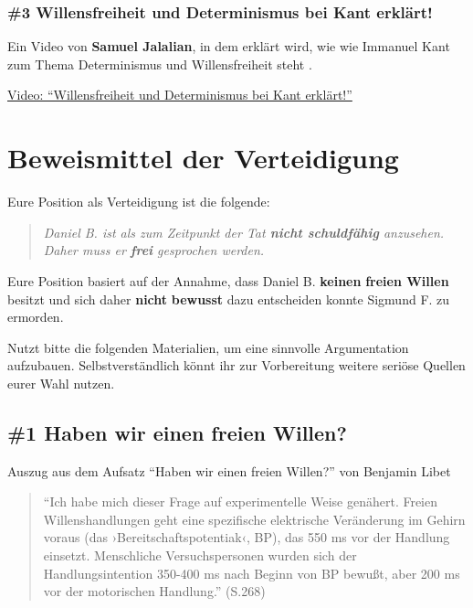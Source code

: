 \documentclass[
  a4paper,
]{report}
\begin{document}
\hypertarget{pr-expert-ev3}{%
\subsection{\#3 Willensfreiheit und Determinismus bei Kant erklärt!}\label{pr-expert-ev3}}

Ein Video von \textbf{Samuel Jalalian}, in dem erklärt wird, wie wie Immanuel Kant zum Thema Determinismus und Willensfreiheit steht \citep{Jalalian2022}.

\href{https://www.youtube.com/watch?v=Z8zJVcFVvX4}{Video: ``Willensfreiheit und Determinismus bei Kant erklärt!''}

\hypertarget{defence-evidence}{%
\chapter{Beweismittel der Verteidigung}\label{defence-evidence}}

Eure Position als Verteidigung ist die folgende:

\begin{quote}
\emph{Daniel B. ist als zum Zeitpunkt der Tat \textbf{nicht schuldfähig} anzusehen. Daher muss er \textbf{frei} gesprochen werden.}
\end{quote}

Eure Position basiert auf der Annahme, dass Daniel B. \textbf{keinen} \textbf{freien Willen} besitzt und sich daher \textbf{nicht} \textbf{bewusst} dazu entscheiden konnte Sigmund F. zu ermorden.

Nutzt bitte die folgenden Materialien, um eine sinnvolle Argumentation aufzubauen. Selbstverständlich könnt ihr zur Vorbereitung weitere seriöse Quellen eurer Wahl nutzen.

\hypertarget{def-ev1}{%
\section{\#1 Haben wir einen freien Willen?}\label{def-ev1}}

Auszug aus dem Aufsatz ``Haben wir einen freien Willen?'' von Benjamin Libet \citeyearpar{Libet2004}

\begin{quote}
``Ich habe mich dieser Frage auf experimentelle Weise genähert. Freien Willenshandlungen geht eine spezifische elektrische Veränderung im Gehirn voraus (das ›Bereitschaftspotentiak‹, BP), das 550 ms vor der Handlung einsetzt. Menschliche Versuchspersonen wurden sich der Handlungsintention 350-400 ms nach Beginn von BP bewußt, aber 200 ms vor der motorischen Handlung.'' (S.268)
\end{quote}
\end{document}
